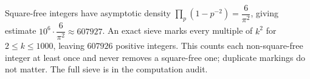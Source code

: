 Square-free integers have asymptotic density $\prod_p(1-p^{-2})=\dfrac{6}{\pi^2}$, giving estimate $10^6\cdot\dfrac{6}{\pi^2}\approx607927$. An exact sieve marks every multiple of $k^2$ for $2\le k\le1000$, leaving $\boxed{607926}$ positive integers. This counts each non-square-free integer at least once and never removes a square-free one; duplicate markings do not matter. The full sieve is in the computation audit.
